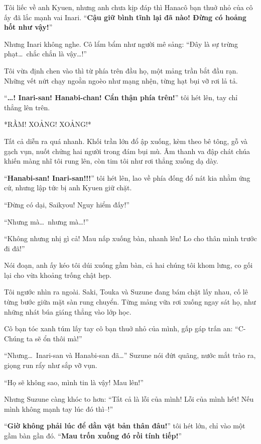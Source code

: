 \documentclass[../main.tex]{subfiles}
\begin{document}
Tôi liếc về anh Kyuen, nhưng anh chưa kịp đáp thì Hanacô bạn thuở nhỏ của cô ấy đã lắc mạnh vai Inari. ``\textbf{Cậu giữ bình tĩnh lại đã nào! Đừng có hoảng hốt như vậy!}''

Nhưng Inari không nghe. Cô lẩm bẩm như người mê sảng: ``Đây là sự trừng phạt\dots\ chắc chắn là vậy\dots!''

Tôi vừa định chen vào thì từ phía trên đầu họ, một mảng trần bắt đầu rạn. Những vết nứt chạy ngoằn ngoèo như mạng nhện, từng hạt bụi vỡ rơi lả tả.

``\textbf{\dots! Inari-san! Hanabi-chan! Cẩn thận phía trên!}'' tôi hét lên, tay chỉ thẳng lên trên.

*RẦM! XOẢNG! XOẢNG!*

Tất cả diễn ra quá nhanh. Khối trần lớn đổ ập xuống, kèm theo bê tông, gỗ và gạch vụn, nuốt chửng hai người trong đám bụi mù. Âm thanh va đập chát chúa khiến màng nhĩ tôi rung lên, còn tim tôi như rơi thẳng xuống dạ dày.


``\textbf{Hanabi-san! Inari-san!!!}'' tôi hét lên, lao về phía đống đổ nát kia nhằm ứng cứ, nhưng lập tức bị anh Kyuen giữ chặt.

``Đừng có dại, Saikyou! Nguy hiểm đấy!''

``Nhưng mà\dots\ nhưng mà\dots!''

``Không nhưng nhị gì cả! Mau nấp xuống bàn, nhanh lên! Lo cho thân mình trước đi đã!''

Nói đoạn, anh ấy kéo tôi dúi xuống gầm bàn, cả hai chúng tôi khom lưng, co gối lại cho vừa khoảng trống chật hẹp.

Tôi ngước nhìn ra ngoài. Saki, Touka và Suzune đang bám chặt lấy nhau, cố lê từng bước giữa mặt sàn rung chuyển. Từng mảng vữa rơi xuống ngay sát họ, như những nhát búa giáng thẳng vào lớp học.


Cô bạn tóc xanh túm lấy tay cô bạn thuở nhỏ của mình, gấp gáp trấn an: ``C-Chúng ta sẽ ổn thôi mà!''

``Nhưng\dots\ Inari-san và Hanabi-san đã\dots'' Suzune nói đứt quãng, nước mắt trào ra, giọng run rẩy như sắp vỡ vụn.

``Họ sẽ không sao, mình tin là vậy! Mau lên!''

Nhưng Suzune càng khóc to hơn: ``Tất cả là lỗi của mình! Lỗi của mình hết! Nếu mình không mạnh tay lúc đó thì--!''

``\textbf{Giờ không phải lúc để dằn vặt bản thân đâu!}'' tôi hét lớn, chỉ vào một gầm bàn gần đó. ``\textbf{Mau trốn xuống đó rồi tính tiếp!}''
\end{document}

